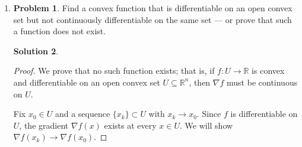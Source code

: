 \documentclass[12pt]{article}
\theoremstyle{definition}
\newtheorem*{solution}{\normalfont\textbf{Solution}}
\newtheorem*{Problem}{\noindent\textbf{Problem}}
\begin{document}
\begin{enumerate}[leftmargin=*]
\begin{solution}
\begin{proof}
                Therefore, for all \(t \in [0, 2/L]\), we have \(t \leq 2/L \leq 2B/A\), so \(t \in [0, 2B/A]\), implying \(\Delta(t) \leq 0\). This completes the proof.

                \textit{Justification of \eqref{eq:cocoercivity}:} Recall the conclusion of problem 1(b), we have
                    $$
                    f(y) - f(x) - \langle \nabla f(x), y - x \rangle \geq \frac{1}{2L} \|\nabla f(y) - \nabla f(x)\|^2.
                    $$
                    Exchanging the order of x and y, we get
                    $$
                    f(x) - f(y) - \langle \nabla f(y), x - y \rangle \geq \frac{1}{2L} \|\nabla f(x) - \nabla f(y)\|^2.
                    $$
                    Adding the two equations gives
                    $$
                    \langle \nabla f(x) - \nabla f(y), x - y \rangle \geq \frac{1}{L} \|\nabla f(x) - \nabla f(y)\|^2.
                    $$ 
                \end{proof}
        \end{solution}
    
    \item \begin{Problem}
            Find a convex function that is differentiable on an open convex set but not continuously differentiable on the same set --- or prove that such a function does not exist.
        \end{Problem}
        \begin{solution}
            \begin{proof}
                We prove that no such function exists; that is, if \( f: U \to \mathbb{R} \) is convex and differentiable on an open convex set \( U \subseteq \mathbb{R}^n \), then \( \nabla f \) must be continuous on \( U \).

                Fix \( x_0 \in U \) and a sequence \( \{x_k\} \subset U \) with \( x_k \to x_0 \). Since \( f \) is differentiable on \( U \), the gradient \( \nabla f(x) \) exists at every \( x \in U \). We will show \( \nabla f(x_k) \to \nabla f(x_0) \).


\end{proof}
\end{solution}
\end{enumerate}
\end{document}
